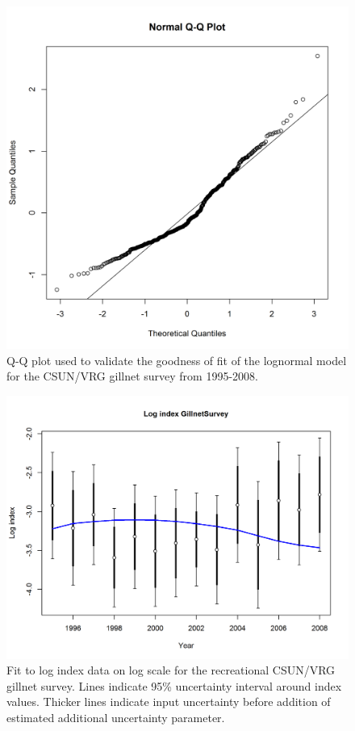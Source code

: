 \documentclass[12pt,]{article}
\begin{document}
\FloatBarrier

\begin{figure}[htbp]
\centering
\includegraphics{Figures/Fleet9_GillnetSurvey_QQ.png}
\caption{Q-Q plot used to validate the goodness of fit of the lognormal
model for the CSUN/VRG gillnet survey from 1995-2008.
\label{fig:Fleet9_GillnetSurvey_QQ}}
\end{figure}

\begin{figure}[htbp]
\centering
\includegraphics{r4ss/plots_mod1/index5_logcpuefit_GillnetSurvey.png}
\caption{Fit to log index data on log scale for the recreational
CSUN/VRG gillnet survey. Lines indicate 95\% uncertainty interval around
index values. Thicker lines indicate input uncertainty before addition
of estimated additional uncertainty parameter.
\label{fig:index5_logcpuefit_GillnetSurvey}}
\end{figure}
\end{document}
